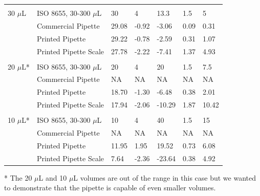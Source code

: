 \documentclass[10pt,letterpaper]{article}
\begin{document}
\begin{table}[!ht]
\begin{adjustwidth}{-2.25in}{0in}
\begin{tabular}{lllllll}
       &                       &        &                  &              &              &               \\
30 $\mu$L  & ISO 8655, 30-300 $\mu$L   & 30     & 4                & 13.3         & 1.5          & 5             \\
       & Commercial Pipette    & 29.08  & -0.92            & -3.06        & 0.09         & 0.31          \\
       & Printed Pipette       & 29.22  & -0.78            & -2.59        & 0.31         & 1.07          \\
       & Printed Pipette Scale & 27.78  & -2.22            & -7.41        & 1.37         & 4.93          \\
       &                       &        &                  &              &              &               \\
20 $\mu$L* & ISO 8655, 30-300 $\mu$L   & 20     & 4                & 20           & 1.5          & 7.5           \\
       & Commercial Pipette    & NA     & NA               & NA           & NA           & NA            \\
       & Printed Pipette       & 18.70  & -1.30            & -6.48        & 0.38         & 2.01          \\
       & Printed Pipette Scale & 17.94  & -2.06            & -10.29       & 1.87         & 10.42         \\
       &                       &        &                  &              &              &               \\
10 $\mu$L* & ISO 8655, 30-300 $\mu$L   & 10     & 4                & 40           & 1.5          & 15            \\
       & Commercial Pipette    & NA     & NA               & NA           & NA           & NA            \\
       & Printed Pipette       & 11.95  & 1.95             & 19.52        & 0.73         & 6.08          \\
       & Printed Pipette Scale & 7.64   & -2.36            & -23.64       & 0.38         & 4.92         
\end{tabular}
\begin{flushleft} * The 20 $\mu$L and 10 $\mu$L volumes are out of the range in this case but we wanted to demonstrate that the pipette is capable of even smaller volumes.
\end{flushleft}
\end{adjustwidth}
\end{table}
\end{document}
